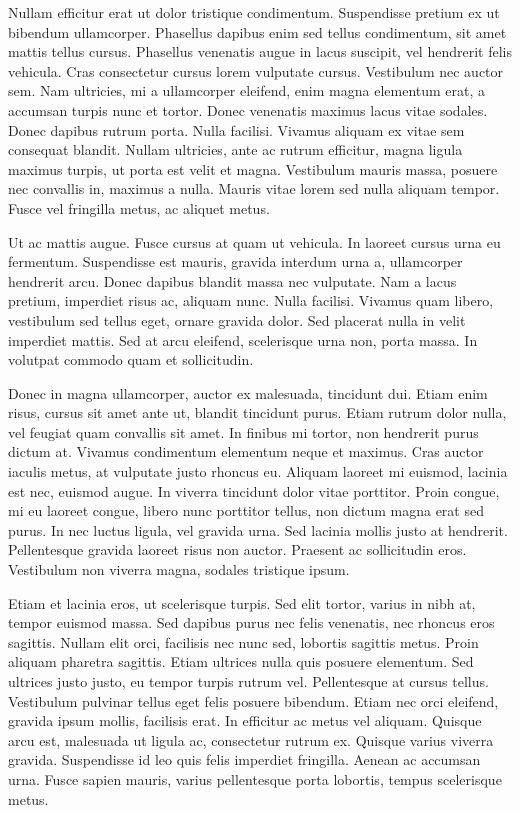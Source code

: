 Nullam efficitur erat ut dolor tristique condimentum. Suspendisse pretium ex ut bibendum ullamcorper. Phasellus dapibus enim sed tellus condimentum, sit amet mattis tellus cursus. Phasellus venenatis augue in lacus suscipit, vel hendrerit felis vehicula. Cras consectetur cursus lorem vulputate cursus. Vestibulum nec auctor sem. Nam ultricies, mi a ullamcorper eleifend, enim magna elementum erat, a accumsan turpis nunc et tortor. Donec venenatis maximus lacus vitae sodales. Donec dapibus rutrum porta. Nulla facilisi. Vivamus aliquam ex vitae sem consequat blandit. Nullam ultricies, ante ac rutrum efficitur, magna ligula maximus turpis, ut porta est velit et magna. Vestibulum mauris massa, posuere nec convallis in, maximus a nulla. Mauris vitae lorem sed nulla aliquam tempor. Fusce vel fringilla metus, ac aliquet metus.

Ut ac mattis augue. Fusce cursus at quam ut vehicula. In laoreet cursus urna eu fermentum. Suspendisse est mauris, gravida interdum urna a, ullamcorper hendrerit arcu. Donec dapibus blandit massa nec vulputate. Nam a lacus pretium, imperdiet risus ac, aliquam nunc. Nulla facilisi. Vivamus quam libero, vestibulum sed tellus eget, ornare gravida dolor. Sed placerat nulla in velit imperdiet mattis. Sed at arcu eleifend, scelerisque urna non, porta massa. In volutpat commodo quam et sollicitudin.

Donec in magna ullamcorper, auctor ex malesuada, tincidunt dui. Etiam enim risus, cursus sit amet ante ut, blandit tincidunt purus. Etiam rutrum dolor nulla, vel feugiat quam convallis sit amet. In finibus mi tortor, non hendrerit purus dictum at. Vivamus condimentum elementum neque et maximus. Cras auctor iaculis metus, at vulputate justo rhoncus eu. Aliquam laoreet mi euismod, lacinia est nec, euismod augue. In viverra tincidunt dolor vitae porttitor. Proin congue, mi eu laoreet congue, libero nunc porttitor tellus, non dictum magna erat sed purus. In nec luctus ligula, vel gravida urna. Sed lacinia mollis justo at hendrerit. Pellentesque gravida laoreet risus non auctor. Praesent ac sollicitudin eros. Vestibulum non viverra magna, sodales tristique ipsum.

Etiam et lacinia eros, ut scelerisque turpis. Sed elit tortor, varius in nibh at, tempor euismod massa. Sed dapibus purus nec felis venenatis, nec rhoncus eros sagittis. Nullam elit orci, facilisis nec nunc sed, lobortis sagittis metus. Proin aliquam pharetra sagittis. Etiam ultrices nulla quis posuere elementum. Sed ultrices justo justo, eu tempor turpis rutrum vel. Pellentesque at cursus tellus. Vestibulum pulvinar tellus eget felis posuere bibendum. Etiam nec orci eleifend, gravida ipsum mollis, facilisis erat. In efficitur ac metus vel aliquam. Quisque arcu est, malesuada ut ligula ac, consectetur rutrum ex. Quisque varius viverra gravida. Suspendisse id leo quis felis imperdiet fringilla. Aenean ac accumsan urna. Fusce sapien mauris, varius pellentesque porta lobortis, tempus scelerisque metus.


